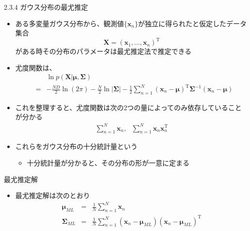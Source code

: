 \begin{frame}{2.3.4 ガウス分布の最尤推定}
 \begin{itemize}
  \item  ある多変量ガウス分布から、観測値$\{\bm{x}_n\}$が独立に得られたと仮定したデータ集合
         \begin{equation}
          \bm{X}=(\bm{x}_1,...,\bm{x}_n)^{\mathrm{T}}
         \end{equation}
         がある時その分布のパラメータは最尤推定法で推定できる
  \item 尤度関数は、
        \begin{eqnarray*}
         && \ln  p(\bm{X}|\bm{\mu}, \bm{\Sigma}) \\
         &=& -\frac{ND}{2}\ln (2\pi)-\frac{N}{2}\ln |\bm{\Sigma}|-\frac{1}{2}\sum_{n=1}^{N}(\bm{x}_n-\bm{\mu})^{\mathrm{T}}\bm{\Sigma}^{-1}(\bm{x}_n-\bm{\mu})
        \end{eqnarray*}
  \item これを整理すると、尤度関数は次の2つの量によってのみ依存していることが分かる
        \begin{eqnarray}
         \sum_{n=1}^{N}\bm{x}_n, \ \ \  \sum_{n=1}^{N}\bm{x}_n\bm{x}_n^{\mathrm{T}}
        \end{eqnarray}
  \item これらをガウス分布の\alert{十分統計量}という
        \begin{itemize}
         \item 十分統計量が分かると、その分布の形が一意に定まる
        \end{itemize}
 \end{itemize}
\end{frame}

\begin{frame}{最尤推定解}
 \begin{itemize}
  \item 最尤推定解は次のとおり
        \begin{eqnarray}
         \bm{\mu}_{ML} &=& \frac{1}{N}\sum_{n=1}^{N}\bm{x}_n\\
         \bm{\Sigma}_{ML}&=&\frac{1}{N}\sum_{n=1}^{N}(\bm{x}_n-\bm{\mu}_{ML})(\bm{x}_n-\bm{\mu}_{ML})^{\mathrm{T}}
        \end{eqnarray}
 \end{itemize}
\end{frame}

